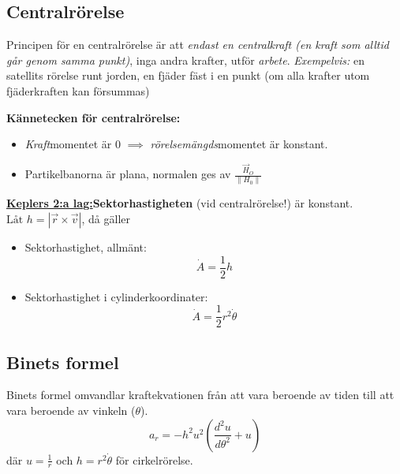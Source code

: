 \documentclass{article}
\newenvironment{ankiflashcard}[1]{}{}
\begin{document}
\begin{paracol}{2}
\begin{ankiflashcard}{Definiera centralrörelse och dess kännetecken.}
    \section{Centralrörelse}
  
    Principen för en centralrörelse är att \textit{endast en centralkraft (en kraft som alltid går genom samma punkt)}, inga andra krafter, utför \textit{arbete}. \textit{Exempelvis:} en satellits rörelse runt jorden, en fjäder fäst i en punkt (om alla krafter utom fjäderkraften kan försummas)

    \textbf{Kännetecken för centralrörelse:}
    \begin{itemize}
        \item \textit{Kraft}momentet är $0$ $\implies$ \textit{rörelsemängds}momentet är konstant. 
        \item Partikelbanorna är plana, normalen ges av $\frac{\vec H_O}{\left\| H_0 \right\|}$
    \end{itemize}
\end{ankiflashcard}

\begin{ankiflashcard}{Definiera sektorhastigheten vid centralrörelse}
    \underline{\textbf{Keplers 2:a lag:}}\textbf{Sektorhastigheten} (vid centralrörelse!) är konstant.
    $\boxed{\text{Låt }h=\left|\vec r \times \vec v\right|}$, då gäller
    \begin{itemize}
        \item Sektorhastighet, allmänt:
        $$\dot A = \frac 1 2 h$$
        \item  Sektorhastighet i cylinderkoordinater:     $$\dot A = \frac 1 2 r^2 \dot \theta$$
    \end{itemize}
\end{ankiflashcard}

\begin{ankiflashcard}{Formulera Binets formel.}
\subsection{Binets formel}
Binets formel omvandlar kraftekvationen från att vara beroende av tiden till att vara beroende av vinkeln ($\theta$).
$$a_r = -h^2u^2\left(\frac{d^2u}{d\theta^2}+u\right)$$
där $u=\frac{1}{r}$ och $h=r^2\dot \theta$ för cirkelrörelse.
\end{ankiflashcard}


\end{paracol}
\end{document}
